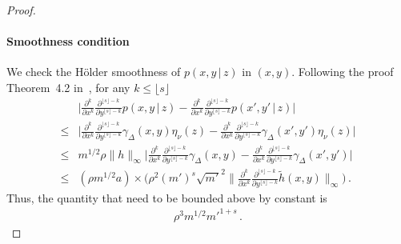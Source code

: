 \documentclass{article}
\theoremstyle{definition}
\theoremstyle{definition}
\theoremstyle{definition}
\theoremstyle{definition}
\theoremstyle{definition}
\theoremstyle{definition}
\theoremstyle{remark}
\theoremstyle{remark}
\newcommand{\given}{\,|\,}
\begin{document}
\begin{proof}
    \paragraph{Smoothness condition}
     We check the H\"older smoothness of $p(x,y\given z)$ in $(x,y)$. Following the proof Theorem~4.2 in~\citet{neykov2021minimax}, for any $k\le \lfloor s \rfloor$
    \begin{align*}
        & \bigg| \frac{\partial^k}{\partial x^k}\frac{\partial^{\lfloor s \rfloor-k}}{\partial y^{\lfloor s \rfloor-k}} p(x,y\given z) -  \frac{\partial^k}{\partial x^k}\frac{\partial^{\lfloor s \rfloor-k}}{\partial y^{\lfloor s \rfloor-k}} p(x',y'\given z)\bigg| \\
        \le & \bigg| \frac{\partial^k}{\partial x^k}\frac{\partial^{\lfloor s \rfloor-k}}{\partial y^{\lfloor s \rfloor-k}} \gamma_{\Delta}(x,y)\eta_{\nu}(z) -  \frac{\partial^k}{\partial x^k}\frac{\partial^{\lfloor s \rfloor-k}}{\partial y^{\lfloor s \rfloor-k}} \gamma_{\Delta}(x',y')\eta_{\nu}(z)\bigg| \\
         \le & m^{1/2}\rho\|h\|_\infty\bigg| \frac{\partial^k}{\partial x^k}\frac{\partial^{\lfloor s \rfloor-k}}{\partial y^{\lfloor s \rfloor-k}} \gamma_{\Delta}(x,y) -  \frac{\partial^k}{\partial x^k}\frac{\partial^{\lfloor s \rfloor-k}}{\partial y^{\lfloor s \rfloor-k}} \gamma_{\Delta}(x',y')\bigg| \\
         \le & (\rho m^{1/2}a) \times \Big(\rho^2(m')^s \sqrt{m'}^2 \bigg\|\frac{\partial^k}{\partial x^k}\frac{\partial^{\lfloor s \rfloor-k}}{\partial y^{\lfloor s \rfloor-k}} \widetilde{h}(x,y) \bigg\|_\infty  \Big)\,.
    \end{align*}
    Thus, the quantity that need to be bounded above by constant is 
    \begin{align*}
        \rho^3 m^{1/2} {m'}^{1+s}  \,.
    \end{align*}


\end{proof}
\end{document}
